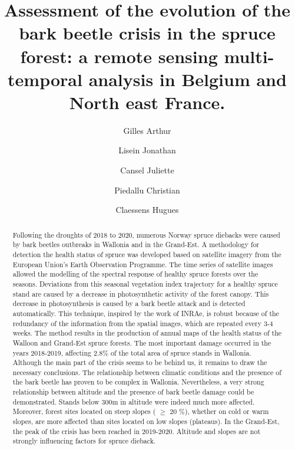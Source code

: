 \documentclass[3p,procedia]{elsarticle}
\begin{document}
\begin{frontmatter}

\author[label1]{Gilles Arthur}
\author[label1]{Lisein Jonathan}
\author[label2]{Cansel Juliette}
\author[label3]{Piedallu Christian}
\author[label1]{Claessens Hugues}




\title{Assessment of the evolution of the bark beetle crisis in the spruce forest: a remote sensing multi-temporal analysis in Belgium and North east France.}
\begin{abstract}
	
\iffalse
Following the droughts of 2018 to 2020, numerous Norway spruce diebacks were caused by bark beetles 
outbreaks in Wallonia and in the Grand-Est. 
A methodology for detection the health status of spruce was developed based on satellite imagery from the European Union's Earth Observation Programme.
The time series of satellite images allowed the modelling of the spectral response of healthy spruce forests over the seasons. Deviations from this seasonal vegetation index trajectory for a healthy spruce stand are caused by a decrease in photosynthetic activity of the forest canopy.
This decrease in photosynthesis is caused by a bark beetle attack and is detected automatically.
This technique, inspired by the work of INRAe, is robust because of the redundancy of the information from the spatial images, which are repeated every 3-4 weeks. 
The method results in the production of annual maps of the health status of the Walloon and Grand-Est spruce forests.
The most important damage occurred in the years 2018-2019, affecting 2.8\% of the total area of spruce stands in Wallonia.
Although the main part of the crisis seems to be behind us, it remains to draw the necessary conclusions.
The relationship between climatic conditions and the presence of the bark beetle has proven to be complex in Wallonia.
Nevertheless, a very strong relationship between altitude and the presence of bark beetle damage could be demonstrated.
Stands below 300m in altitude were indeed much more affected.
Moreover, forest sites located on steep slopes ( $\ge$  20 \%), whether on cold or warm slopes, are more affected than sites located on low slopes (plateaus).
In the Grand-Est, the peak of the crisis has been reached in 2019-2020. Altitude and slopes are not strongly influencing factors for spruce dieback. 


\end{abstract}
\end{frontmatter}
\end{document}
